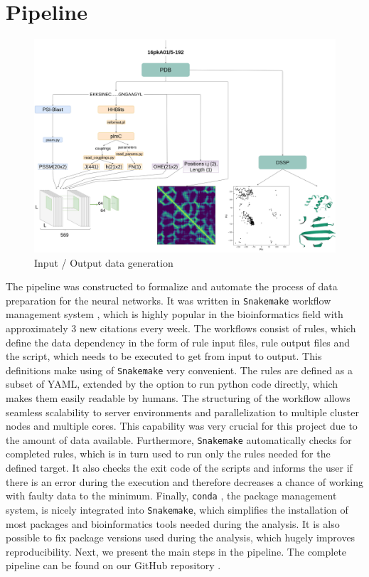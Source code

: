 \section{Pipeline}

\begin{figure}
    \centering
    \includegraphics[width=\linewidth]{imgs_tomas/pipeline_input.png}
    \caption{Input / Output data generation}
    \label{fig:pipeline_input}
\end{figure}

The pipeline was constructed to formalize and automate the process of data preparation for the neural networks.
It was written in \texttt{Snakemake} workflow management system \cite{koster2012snakemake}, which is highly popular in the bioinformatics field with approximately 3 new citations every week.
The workflows consist of rules, which define the data dependency in the form of rule input files, rule output files and the script, which needs to be executed to get from input to output. 
This definitions make using of \texttt{Snakemake} very convenient.
The rules are defined as a subset of YAML, extended by the option to run python code directly, which makes them easily readable by humans.
The structuring of the workflow allows seamless scalability to server environments and parallelization to multiple cluster nodes and multiple cores.
This capability was very crucial for this project due to the amount of data available.
Furthermore, \texttt{Snakemake} automatically checks for completed rules, which is in turn used to run only the rules needed for the defined target.
It also checks the exit code of the scripts and informs the user if there is an error during the execution and therefore decreases a chance of working with faulty data to the minimum.
Finally, \texttt{conda} \cite{conda}, the package management system, is nicely integrated into \texttt{Snakemake}, which simplifies the installation of most packages and bioinformatics tools needed during the analysis.
It is also possible to fix package versions used during the analysis, which hugely improves reproducibility.
Next, we present the main steps in the pipeline.
The complete pipeline can be found on our GitHub repository \cite{github}.

